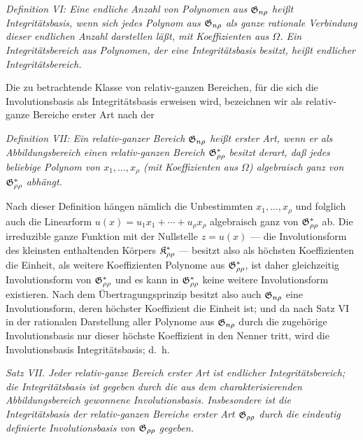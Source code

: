 \emph{Definition VI: Eine endliche Anzahl von Polynomen aus $\mathfrak{G}_{n\rho}$ heißt Integritätsbasis, wenn sich jedes Polynom aus $\mathfrak{G}_{n\rho}$ als ganze rationale Verbindung dieser endlichen Anzahl darstellen läßt, mit Koeffizienten aus $\Omega$. Ein Integritätsbereich aus Polynomen, der eine Integritätsbasis besitzt, heißt endlicher Integritätsbereich.}

Die zu betrachtende Klasse von relativ-ganzen Bereichen, für die sich die Involutionsbasis als Integritätsbasis erweisen wird, bezeichnen wir als relativ-ganze Bereiche erster Art nach der

\emph{Definition VII: Ein relativ-ganzer Bereich $\mathfrak{G}_{n\rho}$ heißt erster Art, wenn er als Abbildungsbereich einen relativ-ganzen Bereich $\mathfrak{G}^*_{\rho\rho}$ besitzt derart, daß jedes beliebige Polynom von $x_1,
\ldots,x_\rho$ (mit Koeffizienten aus $\Omega$) algebraisch ganz von $\mathfrak{G}^*_{\rho\rho}$ abhängt.}

Nach dieser Definition hängen nämlich die Unbestimmten $x_1,
\ldots,x_\rho$ und folglich auch die Linearform $u(x)=u_1x_1+\cdots+u_\rho x_\rho$ algebraisch ganz von $\mathfrak{G}^*_{\rho\rho}$ ab. Die irreduzible ganze Funktion mit der Nullstelle $z=u(x)$ --- die Involutionsform des kleinsten enthaltenden Körpers $\mathfrak{K}^*_{\rho\rho}$ --- besitzt also als höchsten Koeffizienten die Einheit, als weitere Koeffizienten Polynome aus $\mathfrak{G}^*_{\rho\rho}$, ist daher gleichzeitig Involutionsform von $\mathfrak{G}^*_{\rho\rho}$ und es kann in $\mathfrak{G}^*_{\rho\rho}$ keine weitere Involutionsform existieren. Nach dem Übertragungsprinzip besitzt also auch $\mathfrak{G}_{n\rho}$ eine Involutionsform, deren höchster Koeffizient die Einheit ist; und da nach Satz VI in der rationalen Darstellung aller Polynome aus $\mathfrak{G}_{n\rho}$ durch die zugehörige Involutionsbasis nur dieser höchste Koeffizient in den Nenner tritt, wird die Involutionsbasis Integritätsbasis; d.~h.

\emph{Satz VII. Jeder relativ-ganze Bereich erster Art ist endlicher Integritätsbereich; die Integritätsbasis ist gegeben durch die aus dem charakterisierenden Abbildungsbereich gewonnene Involutionsbasis. Insbesondere ist die Integritätsbasis der relativ-ganzen Bereiche erster Art $\mathfrak{G}_{\rho\rho}$ durch die eindeutig definierte Involutionsbasis von $\mathfrak{G}_{\rho\rho}$ gegeben.}

